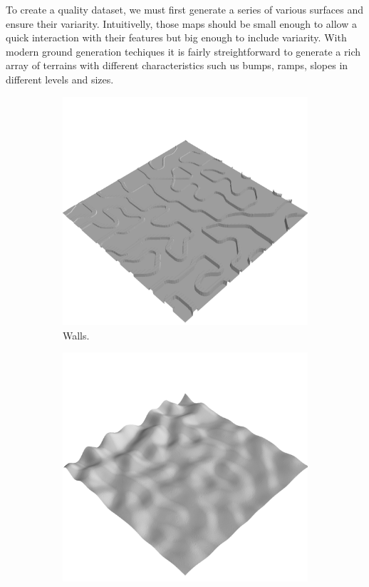 \documentclass[../document.tex]{subfiles}
\begin{document}
To create a quality dataset, we must first generate a series of various surfaces and ensure their variarity. Intuitivelly, those maps should be small enough to allow a quick interaction with their features but big enough to include variarity. With modern ground generation techiques it is fairly streightforward to generate a rich array of terrains with different characteristics such us bumps, ramps, slopes in different levels and sizes. 
\begin{figure}[H]
    \centering
    \begin{subfigure}[b]{0.24\textwidth}
        \includegraphics[width=\linewidth]{../img/hm3d/bars1.png}
        \caption{Walls.}
    \end{subfigure}
    \begin{subfigure}[b]{0.24\textwidth}
        \includegraphics[width=\linewidth]{../img/hm3d/bumps2.png}

\end{subfigure}
\end{figure}
\end{document}
